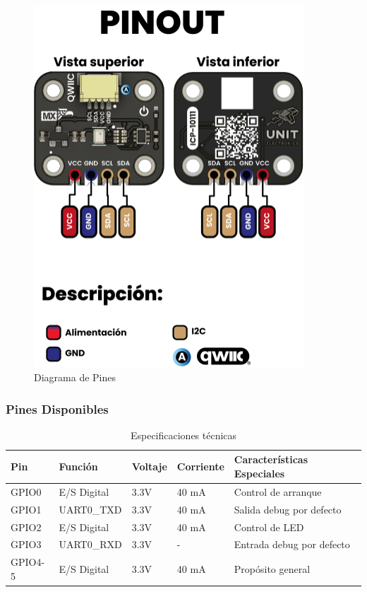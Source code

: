 \documentclass[11pt,a4paper]{article}
\begin{document}
\begin{figure}[H]
\centering
\includegraphics[width=0.9\textwidth]{es_unit_pinout_v_0_0_1_ue0094_icp10111_barometric_pressure_sensor_es.png}
\caption{Diagrama de Pines}
\label{fig:es-unit-pinout-v-0-0-1-ue0094-icp10111-barometric-pressure-sensor-es-png}
\end{figure}



\subsubsection{Pines Disponibles}


\begin{table}[H]
\centering
\small
\begin{tabular}{|l|l|l|l|l|}
\hline
Pin & Función & Voltaje & Corriente & Características Especiales \\
\hline
GPIO0 & E/S Digital & 3.3V & 40 mA & Control de arranque \\
GPIO1 & UART0_TXD & 3.3V & 40 mA & Salida debug por defecto \\
GPIO2 & E/S Digital & 3.3V & 40 mA & Control de LED \\
GPIO3 & UART0_RXD & 3.3V & - & Entrada debug por defecto \\
GPIO4-5 & E/S Digital & 3.3V & 40 mA & Propósito general \\
\hline
\end{tabular}
\caption{Especificaciones técnicas}
\end{table}
\end{document}
